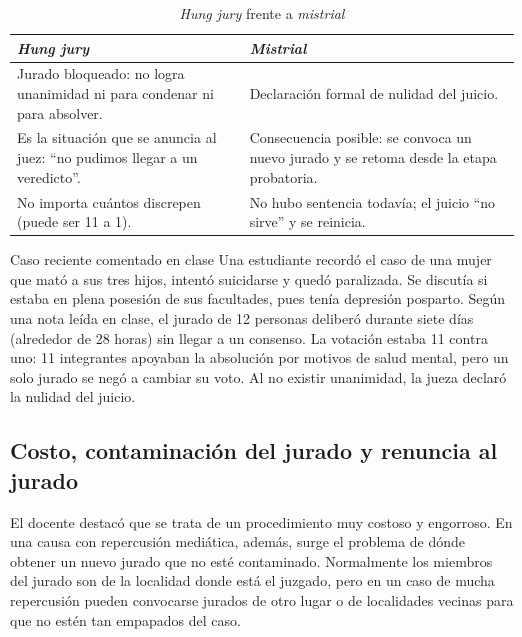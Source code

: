 \documentclass[12pt,oneside]{book}
\begin{document}
\begin{table}[H]
\centering
\small
\caption{\textit{Hung jury} frente a \textit{mistrial}}
\begin{tabularx}{\textwidth}{L L}
\toprule
\textbf{\textit{Hung jury}} & \textbf{\textit{Mistrial}} \\
\midrule
Jurado bloqueado: no logra unanimidad ni para condenar ni para absolver. & Declaración formal de nulidad del juicio. \\
\addlinespace
Es la situación que se anuncia al juez: ``no pudimos llegar a un veredicto''. & Consecuencia posible: se convoca un nuevo jurado y se retoma desde la etapa probatoria. \\
\addlinespace
No importa cuántos discrepen (puede ser 11 a 1). & No hubo sentencia todavía; el juicio ``no sirve'' y se reinicia. \\
\bottomrule
\end{tabularx}
\end{table}

\begin{example}{Caso reciente comentado en clase}
Una estudiante recordó el caso de una mujer que mató a sus tres hijos, intentó suicidarse y quedó paralizada. Se discutía si estaba en plena posesión de sus facultades, pues tenía depresión posparto. Según una nota leída en clase, el jurado de 12 personas deliberó durante siete días (alrededor de 28 horas) sin llegar a un consenso. La votación estaba 11 contra uno: 11 integrantes apoyaban la absolución por motivos de salud mental, pero un solo jurado se negó a cambiar su voto. Al no existir unanimidad, la jueza declaró la nulidad del juicio. %
\end{example}

\subsection{Costo, contaminación del jurado y renuncia al jurado}

El docente destacó que se trata de un procedimiento muy costoso y engorroso. En una causa con repercusión mediática, además, surge el problema de dónde obtener un nuevo jurado que no esté contaminado. Normalmente los miembros del jurado son de la localidad donde está el juzgado, pero en un caso de mucha repercusión pueden convocarse jurados de otro lugar o de localidades vecinas para que no estén tan empapados del caso.
\end{document}
